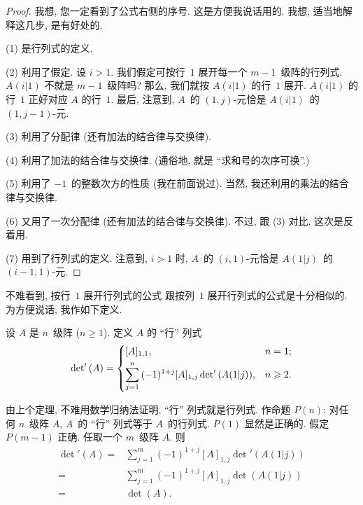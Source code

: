 \begin{proof}
    我想, 您一定看到了公式右侧的序号.
    这是方便我说话用的.
    我想, 适当地解释这几步,
    是有好处的.

    (1) 是行列式的定义.

    (2) 利用了假定.
    设 \(i > 1\).
    我们假定可按行~\(1\) 展开每一个 \(m - 1\)~级阵的行列式.
    \(A(i|1)\) 不就是 \(m - 1\)~级阵吗?
    那么, 我们就按 \(A(i|1)\) 的行~\(1\) 展开.
    \(A(i|1)\) 的行~\(1\) 正好对应
    \(A\) 的行~\(1\).
    最后, 注意到,
    \(A\)~的 \((1, j)\)-元恰是
    \(A(i|1)\)~的 \((1, j - 1)\)-元.

    (3) 利用了分配律 (还有加法的结合律与交换律).

    (4) 利用了加法的结合律与交换律.
    (通俗地, 就是 ``求和号的次序可换''.)

    (5) 利用了 \(-1\)~的整数次方的性质 (我在前面说过).
    当然, 我还利用的乘法的结合律与交换律.

    (6) 又用了一次分配律 (还有加法的结合律与交换律).
    不过, 跟 (3) 对比, 这次是反着用.

    (7) 用到了行列式的定义.
    注意到, \(i > 1\) 时,
    \(A\)~的 \((i, 1)\)-元恰是
    \(A(1|j)\)~的 \((i - 1, 1)\)-元.
\end{proof}

不难看到, 按行~\(1\) 展开行列式的公式%
跟按列~\(1\) 展开行列式的公式是十分相似的.
为方便说话,
我作如下定义.

\begin{definition}[``行'' 列式]
    设 \(A\) 是 \(n\)~级阵 (\(n \geq 1\)).
    定义 \(A\) 的 ``行'' 列式
    \begin{align*}
        \operatorname{det}' {(A)}
        =
        \begin{dcases}
            [A]_{1,1},
             & n = 1;    \\
            \sum_{j = 1}^{n}
            {(-1)^{1+j} [A]_{1,j}
            \operatorname{det}' {(A(1|j))}},
             & n \geq 2.
        \end{dcases}
    \end{align*}
\end{definition}

由上个定理,
不难用数学归纳法证明,
``行'' 列式就是行列式.
作命题 \(P(n)\):
对任何 \(n\)~级阵 \(A\),
\(A\)~的 ``行'' 列式等于 \(A\)~的行列式.
\(P(1)\) 显然是正确的.
假定 \(P(m-1)\) 正确.
任取一个 \(m\)~级阵 \(A\).
则
\begin{align*}
    \operatorname{det}' {(A)}
    = {} & \sum_{j = 1}^{m}
    {(-1)^{1+j} [A]_{1,j} \operatorname{det}' {(A(1|j))}}
    \\
    = {} & \sum_{j = 1}^{m}
    {(-1)^{1+j} [A]_{1,j} \det {(A(1|j))}}
    \\
    = {} & \det {(A)}.
\end{align*}

